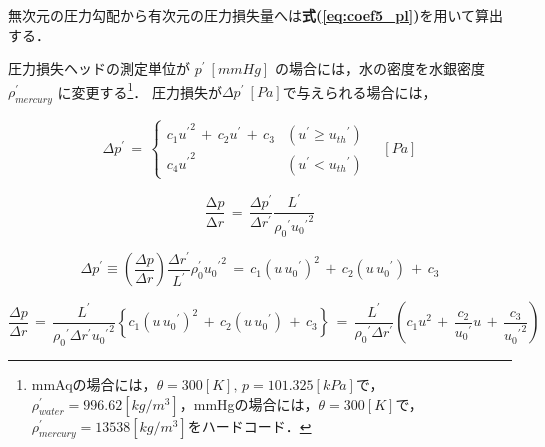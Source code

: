 \noindent 無次元の圧力勾配から有次元の圧力損失量へは\textbf{式(\ref{eq:coef5_pl})}を用いて算出する．\vspace{5mm}


圧力損失ヘッドの測定単位が $p^{\prime}\: [mmHg]$ の場合には，水の密度を水銀密度$\rho_{mercury}^{\prime}$ に変更する\footnote{mmAqの場合には，$\theta =300 [K],\,p=101.325 [kPa]$で，$\rho_{water}^{\prime}=996.62 [kg/m^3]$，mmHgの場合には，$\theta =300 [K]$で，$\rho_{mercury}^{\prime}=13538 [kg/m^3]$をハードコード．}．
圧力損失が$\Delta p^{\prime}\: [Pa]$で与えられる場合には，

\begin{equation}
\Delta p^{\prime}
\,=\,
\left\{{ \begin{array}{ll}
c_{1} {u^{\prime}}^{2} \,+\, c_{2} u^{\prime} \,+\, c_{3} & \left({ u^{\prime} \geq {u_{th}}^{\prime} }\right)\\
c_{4} {u^{\prime}}^{2} & \left({ u^{\prime} < {u_{th}}^{\prime} }\right)
\end{array} \quad }\right. [Pa]
\label{eq:coef10_pl}
\end{equation}

\begin{equation}
\frac{\mathrm{\Delta}{p}}{\mathrm{\Delta}{r}}
\,=\,
\frac{\Delta p^{\prime}}{\Delta r^{\prime}} \frac{L^{\prime}} {{\rho_{0}}^{\prime} {{u_{0}}^{\prime}}^{2}}
\label{eq:coef11_pl}
\end{equation}

\begin{equation}
\Delta p^{\prime} \equiv \left({ \frac{\Delta p}{\Delta r} }\right) \frac{\Delta r^{\prime}}{L^{\prime}} \rho_{0}^{\prime}{{u_{0}}^{\prime}}^{2}
\,=\,
c_{1} {\left({ u\, {u_{0}}^{\prime} }\right) }^{2} \,+\, c_{2} \left({ u\, {u_{0}}^{\prime} }\right)  \,+\, c_{3}
\label{eq:coef12_pl}
\end{equation}

\begin{equation}
\frac{\Delta p}{\Delta r}
\,=\,
\frac{L^{\prime}}{{\rho_{0}}^{\prime} \Delta r^{\prime} {{u_{0}}^{\prime}}^{2}} \left\{{ 
c_{1} {\left({ u\, {u_{0}}^{\prime} }\right) }^{2} \,+\, c_{2} \left({ u\, {u_{0}}^{\prime} }\right)  \,+\, c_{3}
}\right\}
\,=\,
\frac{L^{\prime}}{{\rho_{0}}^{\prime} \Delta r^{\prime}} \left({ 
c_{1} u^{2} \,+\, \frac{c_{2}}{{u_{0}}^{\prime}} u \,+\, \frac{c_{3}}{{{u_{0}}^{\prime}}^{2}}
}\right)
\label{eq:coef13_pl}
\end{equation}

